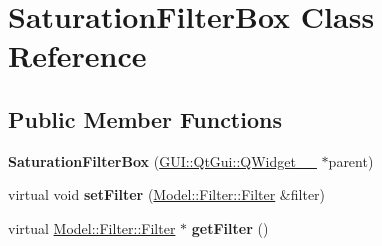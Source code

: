 \hypertarget{classGUI_1_1SaturationFilterBox}{}\section{Saturation\+Filter\+Box Class Reference}
\label{classGUI_1_1SaturationFilterBox}
\subsection*{Public Member Functions}
\begin{DoxyCompactItemize}
\item 
\hypertarget{classGUI_1_1SaturationFilterBox_a7e6460c1d16f5ac09e17ae5f087c80a2}{}{\bfseries Saturation\+Filter\+Box} (\hyperlink{classGUI_1_1QtGui_1_1QWidget____10}{G\+U\+I\+::\+Qt\+Gui\+::\+Q\+Widget\+\_\+\+\_} $\ast$parent)\label{classGUI_1_1SaturationFilterBox_a7e6460c1d16f5ac09e17ae5f087c80a2}

\item 
\hypertarget{classGUI_1_1SaturationFilterBox_ad7c0ee00fe3faac7942d75eec2a5342b}{}virtual void {\bfseries set\+Filter} (\hyperlink{classModel_1_1Filter_1_1Filter}{Model\+::\+Filter\+::\+Filter} \&filter)\label{classGUI_1_1SaturationFilterBox_ad7c0ee00fe3faac7942d75eec2a5342b}

\item 
\hypertarget{classGUI_1_1SaturationFilterBox_acef2029a93f4ab3a538cdb643b9c2613}{}virtual \hyperlink{classModel_1_1Filter_1_1Filter}{Model\+::\+Filter\+::\+Filter} $\ast$ {\bfseries get\+Filter} ()\label{classGUI_1_1SaturationFilterBox_acef2029a93f4ab3a538cdb643b9c2613}

\end{DoxyCompactItemize}
